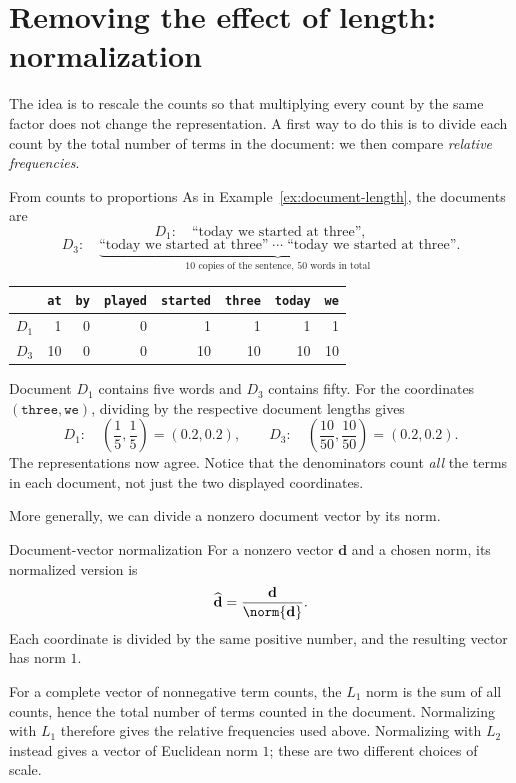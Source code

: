 \documentclass[a4paper,12pt,oneside]{report}
\begin{document}
\section{Removing the effect of length: normalization}

The idea is to rescale the counts so that multiplying every count by
the same factor does not change the representation. A first way to do
this is to divide each count by the total number of terms in the
document: we then compare \emph{relative frequencies}.

\begin{framedexample}{From counts to proportions}
As in Example~\ref{ex:document-length}, the documents are
\[
  D_1:\quad\text{``today we started at three''},
\]
\[
  D_3:\quad\underbrace{\text{``today we started at three''}\;\cdots\;
    \text{``today we started at three''}}_{\text{10 copies of the sentence, 50 words in total}}.
\]
\begin{center}
\begin{tabular}{c|rrrrrrr}
  & \texttt{at} & \texttt{by} & \texttt{played} & \texttt{started}
  & \texttt{three} & \texttt{today} & \texttt{we}\\\hline
  $D_1$ & 1 & 0 & 0 & 1 & 1 & 1 & 1\\
  $D_3$ & 10 & 0 & 0 & 10 & 10 & 10 & 10
\end{tabular}
\end{center}
Document $D_1$ contains five words and $D_3$ contains fifty. For the
coordinates $(\texttt{three},\texttt{we})$, dividing by the respective
document lengths gives
\[
  D_1:\quad\left(\frac15,\frac15\right)=(0.2,0.2),\qquad
  D_3:\quad\left(\frac{10}{50},\frac{10}{50}\right)=(0.2,0.2).
\]
The representations now agree. Notice that the denominators count
\emph{all} the terms in each document, not just the two displayed
coordinates.
\end{framedexample}

More generally, we can divide a nonzero document vector by its norm.
\begin{frameddefn}{Document-vector normalization}\label{def:document-normalization}
For a nonzero vector $\mathbf d$ and a chosen norm, its normalized
version is
\[
  \widehat{\mathbf d}=\frac{\mathbf d}{\norm{\mathbf d}}.
\]
Each coordinate is divided by the same positive number, and the
resulting vector has norm $1$.
\end{frameddefn}

For a complete vector of nonnegative term counts, the $L_1$ norm is
the sum of all counts, hence the total number of terms counted in the
document. Normalizing with $L_1$ therefore gives the relative
frequencies used above. Normalizing with $L_2$ instead gives a vector
of Euclidean norm $1$; these are two different choices of scale.
\end{document}
